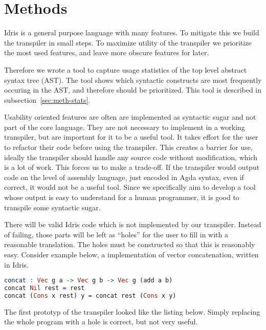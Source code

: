 \chapter{Methods}

Idris is a general purpose language with many features.  To mitigate this we
build the transpiler in small steps.  To maximize utility of the transpiler we
prioritize the most used features, and leave more obscure features for later.

Therefore we wrote a tool to capture usage statistics of the top level abstract
syntax tree (AST). The tool shows which syntactic constructs are most
frequently occuring in the AST, and therefore should be prioritized. This tool
is described in subsection~\ref{sec:meth-stats}.

Usability oriented features are often are implemented as syntactic sugar and
not part of the core language. They are not necessary to implement in a working
transpiler, but are important for it to be a useful tool. It takes effort for
the user to refactor their code before using the transpiler. This creates
a barrier for use, ideally the transpiler should handle any source code without
modification, which is a lot of work.  This forces us to make a trade-off.  If
the transpiler would output code on the level of assembly language, just
encoded in Agda syntax, even if correct, it would not be a useful tool. Since
we specifically aim to develop a tool whose output is easy to understand for
a human programmer, it is good to transpile some syntactic sugar.



There will be valid Idris code which is not implemented by our transpiler.
Instead of failing, those parts will be left as ``holes'' for the user to fill in
with a reasonable translation.
The holes must be constructed so that this is reasonably easy.
Consider example below, a implementation of vector concatenation, written in
Idris.

\begin{lstlisting}[language=Idris,label={lst:hole1},caption={}]
concat : Vec g a -> Vec g b -> Vec g (add a b)
concat Nil rest = rest
concat (Cons x rest) y = concat rest (Cons x y)
\end{lstlisting}

The first prototyp of the transpiler looked like the listing below.  Simply
replacing the whole program with a hole is correct, but not very useful.

